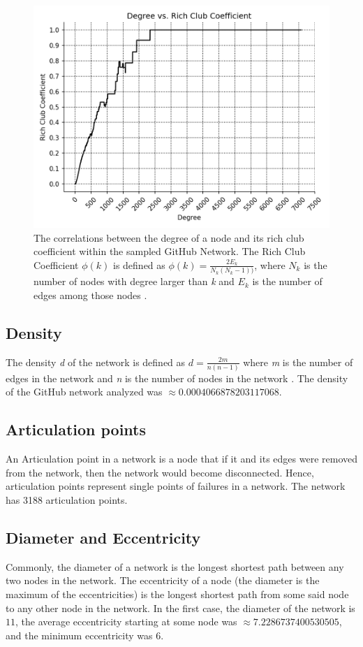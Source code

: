 \documentclass[9pt,twocolumn,twoside]{pnas-new}
\begin{document}
\begin{figure}
\centering
\includegraphics[width=.8\linewidth]{rich_club_coefficients}
\caption{The correlations between the degree of a node and its rich club coefficient within the sampled GitHub Network. The Rich Club Coefficient $\phi(k)$ is defined as $\phi(k)=\frac{2E_{k}}{N_{k}(N_{k} - 1))}$, where $N_{k}$ is the number of nodes with degree larger than \textit{k} and $E_{k}$ is the number of edges among those nodes \cite{networkxrichclubcoefficients}.
}
\label{fig:rich_club_coefficients}
\end{figure}

\subsection{Density} The density \textit{d} of the network is defined as
$d= \frac{2m}{n(n-1)}$
where \textit{m} is the number of edges in the network and \textit{n} is the number of nodes in the network \cite{networkxdensity}. The density of the GitHub network analyzed was $\approx 0.0004066878203117068$.

\subsection{Articulation points} An Articulation point in a network is a node that if it and its edges were removed from the network, then the network would become disconnected. Hence, articulation points represent single points of failures in a network. The network has 3188 articulation points.

\subsection{Diameter and Eccentricity} Commonly, the diameter of a network is the longest shortest path between any two nodes in the network. The eccentricity of a node (the diameter is the maximum of the eccentricities) is the longest shortest path from some said node to any other node in the network. In the first case, the diameter of the network is $11$, the average eccentricity starting at some node was $\approx 7.2286737400530505$, and the minimum eccentricity was $6$.
\end{document}

